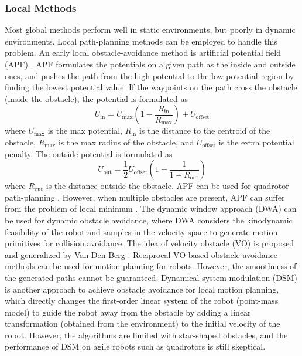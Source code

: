 \documentclass[letterpaper,journal,twoside]{IEEEtran}
\begin{document}
\subsubsection{Local Methods}
Most global methods perform well in static environments, 
but poorly in dynamic environments. 
Local path-planning methods can be employed to handle 
this problem. 
An early local obstacle-avoidance method is artificial 
potential field (APF) \cite{warren1989global}.
APF formulates the potentials on a given path as the 
inside and outside ones, and pushes the path from the
high-potential to the low-potential region by finding the 
lowest potential value. 
If the waypoints on the path cross the 
obstacle (inside the obstacle), the potential is formulated as 
\[
U_{\text{in}} = 
U_{\text{max}}\left(1 - \frac{R_{\text{in}}}{R_{\text{max}}}\right) + 
U_{\text{offset}}
\]
where $U_{\text{max}}$ is the max potential, 
$R_{\text{in}}$ is the distance to the centroid of the 
obstacle, $R_{\text{max}}$ is the max radius of the 
obstacle, and $U_{\text{offset}}$ is the extra 
potential penalty.
The outside potential is formulated as 
\[
U_{\text{out}} = 
\frac{1}{2}U_{\text{offset}}\left(1+ \frac{1}{1+R_\text{out}}\right)
\]
where $R_{\text{out}}$ is the distance outside the obstacle.
APF can be used for quadrotor path-planning \cite{chen2016uav}.
However, when multiple obstacles are present, APF can suffer 
from the problem of local minimum \cite{koren1991potential}.
The dynamic window approach (DWA) \cite{seder2007dynamic} can 
be used for dynamic obstacle avoidance, where DWA considers
the kinodynamic feasibility of the robot and samples in the 
velocity space to generate motion primitives for collision 
avoidance. 
The idea of velocity obstacle (VO) is proposed and generalized
by Van Den Berg \cite{van2011reciprocal,van2011reciprocal2,bareiss2013reciprocal}.
Reciprocal VO-based obstacle avoidance methods can be used
for motion planning for robots.  
However, the smoothness of the generated paths cannot be 
guaranteed. 
Dynamical system modulation (DSM)
\cite{khansari2012dynamical,huber2022fast,huber2023avoidance}
is another approach to achieve obstacle avoidance for local
motion planning, which directly changes the first-order 
linear system of the robot (point-mass model) to guide the 
robot away from the obstacle by adding a linear transformation
(obtained from the environment) to the initial velocity of 
the robot.
However, the algorithms are limited with star-shaped obstacles, 
and the performance of DSM on agile robots such as quadrotors
is still skeptical.
\end{document}
